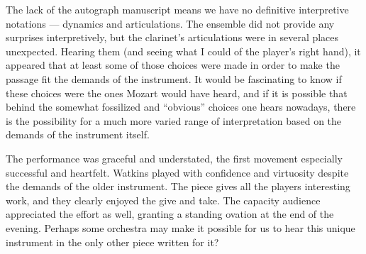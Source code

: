 The lack of the autograph manuscript means we have no definitive interpretive notations — dynamics and articulations. The ensemble did not provide any surprises interpretively, but the clarinet’s articulations were in several places unexpected. Hearing them (and seeing what I could of the player’s right hand), it appeared that at least some of those choices were made in order to make the passage fit the demands of the instrument. It would be fascinating to know if these choices were the ones Mozart would have heard, and if it is possible that behind the somewhat fossilized and “obvious” choices one hears nowadays, there is the possibility for a much more varied range of interpretation based on the demands of the instrument itself.

The performance was graceful and understated, the first movement especially successful and heartfelt. Watkins played with confidence and virtuosity despite the demands of the older instrument. The piece gives all the players interesting work, and they clearly enjoyed the give and take. The capacity audience appreciated the effort as well, granting a standing ovation at the end of the evening. Perhaps some orchestra may make it possible for us to hear this unique instrument in the only other piece written for it?
